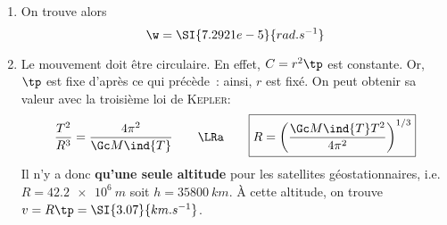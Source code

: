 \documentclass[../main/main.tex]{subfiles}
\begin{document}
\begin{enumerate}[resume]
    \item[] On trouve alors
        \[\w = \SI{7.2921e-5}{rad.s^{-1}}\]
    \item{Le mouvement doit être circulaire}. En effet, $C=r^2\tp$ est
        constante. Or, $\tp$ est fixe d'après ce qui précède~: ainsi, $r$ est
        fixé. On peut obtenir sa valeur avec la troisième loi de
        \textsc{Kepler}:
        \[
            \frac{T^2}{R^3} = \frac{4\pi^2}{\Gc M\ind{T}}
            \qquad
            \LRa
            \qquad
            \boxed{R = \left( \frac{\Gc M\ind{T} T^2}{4\pi^2} \right)^{1/3}}
        \]
        Il n'y a donc \textbf{qu'une seule altitude} pour les satellites
        géostationnaires, i.e. $R = \SI{42.2e6}{m}$ soit $h = \SI{35800}{km}$.
        \smallbreak
        À cette altitude, on trouve $v = R\tp = \SI{3.07}{km.s^{-1}}$.
\end{enumerate}
\end{document}
